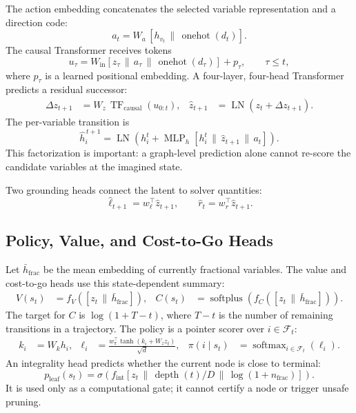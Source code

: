 \documentclass[11pt,a4paper]{article}
\newcommand{\softmax}{\operatorname{softmax}}
\newcommand{\fracset}{\mathcal{F}}
\begin{document}
The action embedding concatenates the selected variable representation and a direction code:
\begin{equation}
  a_t=W_a\,[h_{v_t}\,\|\,\operatorname{onehot}(d_t)].
  \label{eq:action}
\end{equation}
The causal Transformer receives tokens
\begin{equation}
  u_\tau=W_{\mathrm{in}}
  [z_\tau\,\|\,a_\tau\,\|\,\operatorname{onehot}(d_\tau)]
  +p_\tau ,
  \qquad \tau\le t ,
  \label{eq:token}
\end{equation}
where $p_\tau$ is a learned positional embedding. A four-layer, four-head Transformer predicts a residual successor:
\begin{align}
  \Delta z_{t+1}
    &=W_z\,\operatorname{TF}_{\mathrm{causal}}(u_{0:t}), &
  \widehat z_{t+1}
    &=\operatorname{LN}(z_t+\Delta z_{t+1}).
  \label{eq:latent-transition}
\end{align}
The per-variable transition is
\begin{equation}
  \widehat h_i^{\,t+1}
  =
  \operatorname{LN}\!\left(
    h_i^t+
    \operatorname{MLP}_h
      [h_i^t\,\|\,\widehat z_{t+1}\,\|\,a_t]
  \right).
  \label{eq:variable-transition}
\end{equation}
This factorization is important: a graph-level prediction alone cannot re-score the candidate variables at the imagined state.

Two grounding heads connect the latent to solver quantities:
\begin{equation}
  \widehat \ell_{t+1}=w_\ell^\top\widehat z_{t+1},
  \qquad
  \widehat r_t=w_r^\top\widehat z_{t+1}.
  \label{eq:grounding}
\end{equation}

\subsection{Policy, Value, and Cost-to-Go Heads}

Let $\bar h_{\mathrm{frac}}$ be the mean embedding of currently fractional variables. The value and cost-to-go heads use this state-dependent summary:
\begin{align}
  V(s_t)&=f_V([z_t\,\|\,\bar h_{\mathrm{frac}}]), &
  C(s_t)&=\operatorname{softplus}
       \left(f_C([z_t\,\|\,\bar h_{\mathrm{frac}}])\right).
  \label{eq:value-cost}
\end{align}
The target for $C$ is $\log(1+T-t)$, where $T-t$ is the number of remaining transitions in a trajectory. The policy is a pointer scorer over $i\in\fracset_t$:
\begin{align}
  k_i&=W_kh_i, &
  \ell_i&=
  \frac{w_\pi^\top
    \tanh(k_i+W_zz_t)}{\sqrt d}, &
  \pi(i\mid s_t)&=\softmax_{i\in\fracset_t}(\ell_i).
  \label{eq:policy}
\end{align}
An integrality head predicts whether the current node is close to terminal:
\begin{equation}
  p_{\mathrm{leaf}}(s_t)=
  \sigma\!\left(
    f_{\mathrm{int}}
      [z_t\,\|\,\operatorname{depth}(t)/D\,\|\,\log(1+n_{\mathrm{frac}})]
  \right).
  \label{eq:integrality}
\end{equation}
It is used only as a computational gate; it cannot certify a node or trigger
unsafe pruning.
\end{document}
